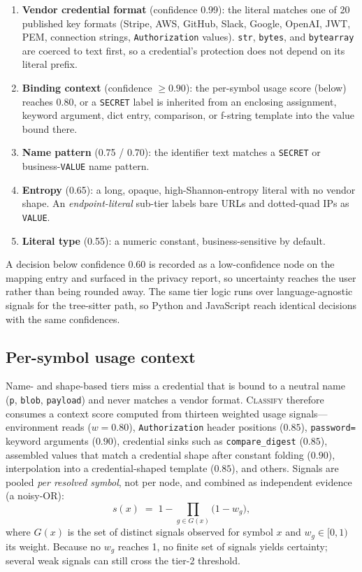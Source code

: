 \documentclass[conference]{IEEEtran}
\begin{document}
\begin{enumerate}
\item \textbf{Vendor credential format} (confidence 0.99): the literal
matches one of 20 published key formats (Stripe, AWS, GitHub, Slack,
Google, OpenAI, JWT, PEM, connection strings, \texttt{Authorization}
values). \texttt{str}, \texttt{bytes}, and \texttt{bytearray} are coerced
to text first, so a credential's protection does not depend on its literal
prefix.
\item \textbf{Binding context} (confidence $\ge 0.90$): the per-symbol
usage score (below) reaches 0.80, or a \texttt{SECRET} label is inherited
from an enclosing assignment, keyword argument, dict entry, comparison, or
f-string template into the value bound there.
\item \textbf{Name pattern} (0.75 / 0.70): the identifier text matches a
\texttt{SECRET} or business-\texttt{VALUE} name pattern.
\item \textbf{Entropy} (0.65): a long, opaque, high-Shannon-entropy
literal with no vendor shape. An \emph{endpoint-literal} sub-tier labels
bare URLs and dotted-quad IPs as \texttt{VALUE}.
\item \textbf{Literal type} (0.55): a numeric constant, business-sensitive
by default.
\end{enumerate}

A decision below confidence 0.60 is recorded as a low-confidence node on
the mapping entry and surfaced in the privacy report, so uncertainty
reaches the user rather than being rounded away. The same tier logic runs
over language-agnostic signals for the tree-sitter path, so Python and
JavaScript reach identical decisions with the same confidences.

\subsection{Per-symbol usage context}

Name- and shape-based tiers miss a credential that is bound to a
neutral name (\texttt{p}, \texttt{blob}, \texttt{payload}) and never
matches a vendor format. \textsc{Classify} therefore consumes a context
score computed from thirteen weighted usage signals---environment reads
($w{=}0.80$), \texttt{Authorization} header positions ($0.85$),
\texttt{password=} keyword arguments ($0.90$), credential sinks such as
\texttt{compare\_digest} ($0.85$), assembled values that match a
credential shape after constant folding ($0.90$), interpolation into a
credential-shaped template ($0.85$), and others. Signals are pooled
\emph{per resolved symbol}, not per node, and combined as independent
evidence (a noisy-OR):
\begin{equation}
s(x) \;=\; 1 - \prod_{g \in G(x)} \bigl(1 - w_g\bigr),
\label{eq:noisyor}
\end{equation}
where $G(x)$ is the set of distinct signals observed for symbol $x$ and
$w_g \in [0,1)$ its weight. Because no $w_g$ reaches 1, no finite set of
signals yields certainty; several weak signals can still cross the
tier-2 threshold.
\end{document}
